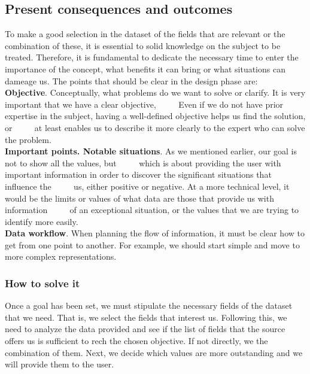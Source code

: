 \subsection{Present consequences and outcomes}
To make a good selection in the dataset of the fields that are relevant or the combination of these, it is essential to
solid knowledge on the subject to be treated. Therefore, it is fundamental to dedicate the necessary time to enter the
importance of the concept, what benefits it can bring or what situations can dameage us.
The points that should be clear in the design phase are: \\

\textbf{Objective}. Conceptually, what problems do we want to solve or clarify. It is very important that we have a clear objective,
     Even if we do not have prior expertise in the subject, having a well-defined objective helps us find the solution, or
     at least enables us to describe it more clearly to the expert who can solve the problem. \\

\textbf{Important points. Notable situations}. As we mentioned earlier, our goal is not to show all the values, but
     which is about providing the user with important information in order to discover the significant situations that influence the
     us, either positive or negative. At a more technical level, it would be the limits or values of what data are those that provide us with information
     of an exceptional situation, or the values that we are trying to identify more easily. \\

\textbf{Data workflow}. When planning the flow of information, it must be clear how to get from one point to another. For example, 
we should start simple and move to more complex representations.

\subsubsection*{How to solve it} 
Once a goal has been set, we must stipulate the necessary fields of the dataset that we need. That is, we select the fields that interest us. 
Following this, we need to analyze the data provided and see if the list of fields that the source offers us is sufficient to rech the chosen objective.
If not directly, we the combination of them. Next, we decide which values are more outstanding and we will provide them to the user.

